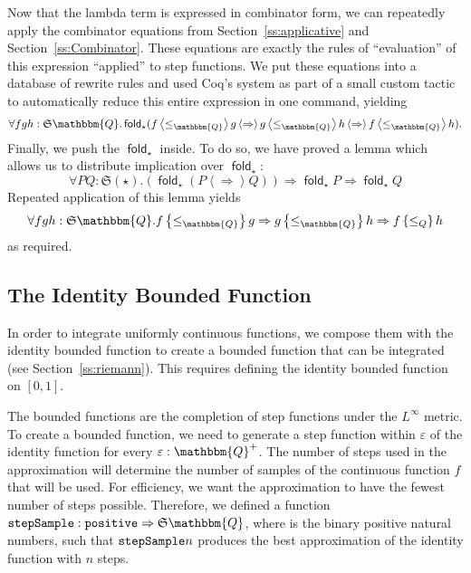 \documentclass{elsarticle}
\newcommand{\op}[1]{#1}
\newcommand{\tmop}[1]{\ensuremath{\operatorname{#1}}}
\newcommand{\tmtexttt}[1]{{\ttfamily{#1}}}
\newcommand{\Prop}{\ensuremath{\op{\star}}}
\newcommand{\maptwo}[1]{\ensuremath{\left\langle #1 \right\rangle}}
\newcommand{\foldmaptwo}[1]{\ensuremath{\left\{ #1 \right\}}}
\newcommand{\Q}{\ensuremath{\mathbbm{Q}}}
\newcommand{\SF}{\ensuremath{\mathfrak{S}}}
\begin{document}
Now that the lambda term is expressed in combinator form, we can repeatedly
apply the combinator equations from Section~\ref{ss:applicative} and
Section~\ref{ss:Combinator}. These equations are exactly the rules of
``evaluation'' of this expression ``applied'' to step functions. We put these
equations into a database of rewrite rules and used Coq's
\tmtexttt{autorewrite} system as part of a small custom tactic to
automatically reduce this entire expression in one command, yielding
\[ \forall f g h : \SF \mathbbm{Q}. \tmop{\mathsf{fold}}_{\Prop} (f
   \maptwo{\leq_{\mathbbm{Q}}} g \maptwo{\Rightarrow} g
   \maptwo{\leq_{\mathbbm{Q}}} h \maptwo{\Rightarrow} f
   \maptwo{\leq_{\mathbbm{Q}}} h) . \]
Finally, we push the $\tmop{\mathsf{fold}}_{\Prop}$ inside. To do so, we have
proved a lemma which allows us to distribute implication over
$\tmop{\mathsf{fold}}_{\Prop}$:
\[ \forall P Q : \SF ( \Prop) . ( \tmop{\mathsf{fold}}_{\Prop} (P
   \maptwo{\op{\Rightarrow}} Q)) \Rightarrow \tmop{\mathsf{fold}}_{\Prop} P
   \Rightarrow \tmop{\mathsf{fold}}_{\Prop} Q \]
Repeated application of this lemma yields
\[ \forall f g h : \SF \Q . f \foldmaptwo{\leq_{\mathbbm{Q}}} g \Rightarrow g
   \foldmaptwo{\leq_{\mathbbm{Q}}} h \Rightarrow f \foldmaptwo{\leq_Q} h \]
as required.

\subsection{The Identity Bounded Function}\label{ss:id01}

In order to integrate uniformly continuous functions, we compose them with the
identity bounded function to create a bounded function that can be integrated
(see Section~\ref{ss:riemann}). This requires defining the identity bounded
function on $[0, 1]$.

The bounded functions are the completion of step functions under the
$L^{\infty}$ metric. To create a bounded function, we need to generate a step
function within $\varepsilon$ of the identity function for every $\varepsilon
: \mathbbm{Q}^+$. The number of steps used in the approximation will determine
the number of samples of the continuous function $f$ that will be used. For
efficiency, we want the approximation to have the fewest number of steps
possible. Therefore, we defined a function
$\text{\tmtexttt{stepSample}} :
\text{\tmtexttt{positive}} \Rightarrow \SF \mathbbm{Q}$, where
\tmtexttt{positive} is the binary positive natural numbers, such that
$\text{\tmtexttt{stepSample}} n$ produces the best approximation of the
identity function with $n$ steps.
\end{document}
